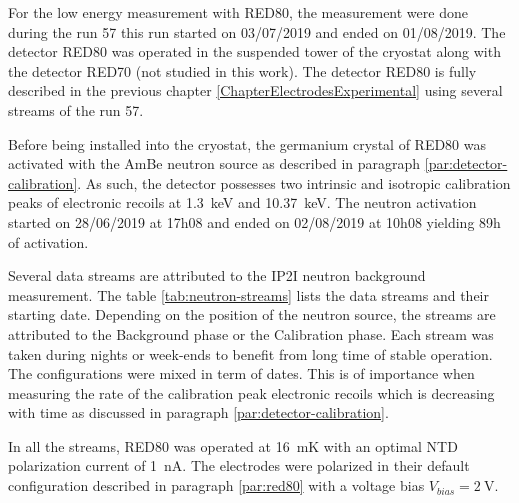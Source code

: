 For the low energy measurement with RED80, the measurement were done during the run 57 this run started on 03/07/2019 and ended on 01/08/2019. The detector RED80 was operated in the suspended tower of the cryostat along with the detector RED70 (not studied in this work). The detector RED80 is fully described in the previous chapter \ref{ChapterElectrodesExperimental} using several streams of the run 57.

Before being installed into the cryostat, the germanium crystal of RED80 was activated with the AmBe neutron source as described in paragraph \ref{par:detector-calibration}. As such, the detector possesses two intrinsic and isotropic calibration peaks of electronic recoils at \SI{1.3}{\kilo\eV} and \SI{10.37}{\kilo\eV}. The neutron activation started on 28/06/2019 at 17h08 and ended on 02/08/2019 at 10h08 yielding 89h of activation.

Several data streams are attributed to the IP2I neutron background measurement. The table \ref{tab:neutron-streams} lists the data streams and their starting date. Depending on the position of the neutron source, the streams are attributed to the Background phase or the Calibration phase.
Each stream was taken during nights or week-ends to benefit from long time of stable operation. The configurations were mixed in term of dates. This is of importance when measuring the rate of the calibration peak electronic recoils which is decreasing with time as discussed in paragraph \ref{par:detector-calibration}.

In all the streams, RED80 was operated at \SI{16}{\milli\kelvin} with an optimal NTD polarization current of \SI{1}{\nano\ampere}. The electrodes were polarized in their default configuration described in paragraph \ref{par:red80} with a voltage bias $V_{bias} = \SI{2}{\volt}$.

